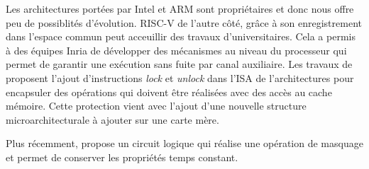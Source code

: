Les architectures portées par Intel et ARM sont propriétaires et donc nous offre peu de possiblités d'évolution. RISC-V de l'autre côté, grâce à son enregistrement dans l'espace commun peut acceuillir des travaux d'universitaires. Cela a permis à des équipes Inria de développer des mécanismes au niveau du processeur qui permet de garantir une exécution sans fuite par canal auxiliaire. Les travaux de \citeauthor{twartingCT} \cite{twartingCT} proposent l'ajout d'instructions \textit{lock} et \textit{unlock} dans l'ISA de l'architectures pour encapsuler des opérations qui doivent être réalisées avec des accès au cache mémoire. Cette protection vient avec l'ajout d'une nouvelle structure microarchitecturale à ajouter sur une carte mère.\smallbreak

Plus récemment, \citeauthor{cryptoeprint:2025/1331} \cite{cryptoeprint:2025/1331} propose un circuit logique qui réalise une opération de masquage et permet de conserver les propriétés temps constant.

